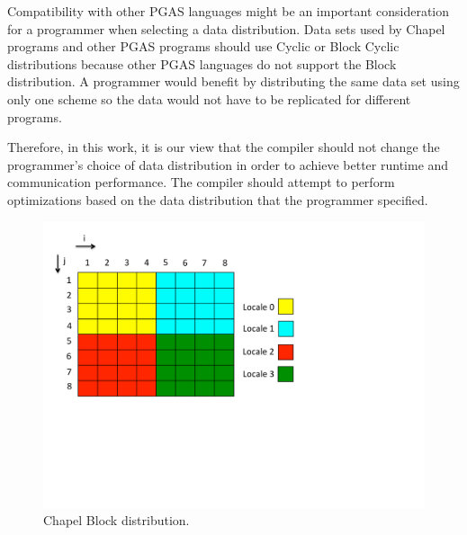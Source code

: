 Compatibility with other PGAS languages might be an important consideration for a programmer when selecting a data distribution. Data sets used by Chapel programs and other PGAS programs should use Cyclic or Block Cyclic distributions because other PGAS languages do not support the Block distribution. A programmer would benefit by distributing the same data set using only one scheme so the data would not have to be replicated for different programs. 

Therefore, in this work, it is our view that the compiler should not change the programmer's choice of data distribution in order to achieve better runtime and communication performance. The compiler should attempt to perform optimizations based on the data distribution that the programmer specified. 

\begin{figure}
	\begin{center}
	\includegraphics[scale=0.55]{./Figures/block_dist}
	\caption{Chapel Block distribution.}
	\label{block_dist}
	\end{center}
\end{figure}

